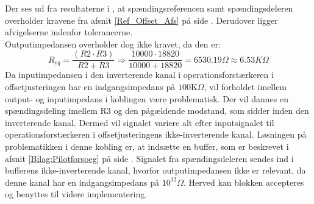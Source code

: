 Der ses ud fra resultaterne i , at spændingsreferencen samt spændingsdeleren overholder kravene fra afsnit \ref{Ref_Offset_Afs} på side \pageref{Ref_Offset_Afs}. Derudover ligger afvigelserne indenfor tolerancerne. \\
Outputimpedansen overholder dog ikke kravet, da den er:
\begin{equation}
R_{eq} = \dfrac{(R2 \cdot R3)}{R2 + R3} \Longrightarrow \dfrac{10000 \cdot 18820}{10000 + 18820} = 6530.19\Omega \approx 6.53K\Omega
\end{equation}
Da inputimpedansen i den inverterende kanal i operationsforstærkeren i offsetjusteringen har en indgangsimpedans på $100$K$\Omega$, vil forholdet imellem output- og inputimpedans i koblingen være problematisk. Der vil dannes en spændingsdeling imellem R$3$ og den pågældende modstand, som sidder inden den inverterende kanal. Dermed vil signalet variere alt efter inputsignalet til operationsforstærkeren i offsetjusteringens ikke-inverterende kanal. Løsningen på problematikken i denne kobling er, at indsætte en buffer, som er beskrevet i afsnit \ref{Bilag:Pilotforsoeg} på side \pageref{Bilag:Pilotforsoeg}.\cite{Schaumann2014} Signalet fra spændingsdeleren sendes ind i bufferens ikke-inverterende kanal, hvorfor outputimpedansen ikke er relevant, da denne kanal har en indgangsimpedans på $10^{12}\Omega$. Herved kan blokken accepteres og benyttes til videre implementering.